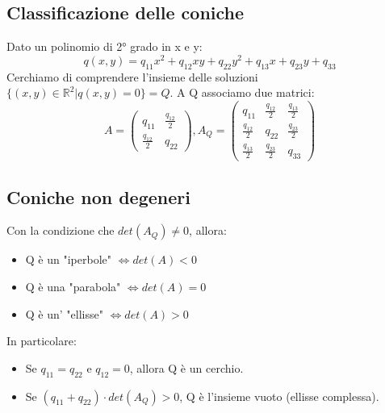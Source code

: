 \documentclass[12pt]{article}
\newenvironment{para}{\begin{adjustwidth}{13mm}{}}{\end{adjustwidth}}
\begin{document}
\begin{para}
\section{Classificazione delle coniche}
Dato un polinomio di 2° grado in x e y: $$q(x,y) = q_{11}x^2+q_{12}xy+q_{22}y^2+q_{13}x+q_{23}y+q_{33}$$
Cerchiamo di comprendere l'insieme delle soluzioni $\{(x,y) \in \mathbb{R}^2 | q(x,y)=0\} = Q$. A Q associamo due matrici: $$A = \begin{pmatrix}
    q_{11} & \frac{q_{12}}{2}\\
    \frac{q_{12}}{2} & q_{22}
\end{pmatrix}, A_Q=\begin{pmatrix}
    q_{11} & \frac{q_{12}}{2} & \frac{q_{13}}{2} \\
    \frac{q_{12}}{2} & q_{22} & \frac{q_{23}}{2} \\
    \frac{q_{13}}{2} & \frac{q_{23}}{2} & q_{33}
\end{pmatrix}$$
\subsection{Coniche non degeneri}
Con la condizione che $det(A_Q) \neq 0$, allora: 
\begin{itemize}
    \item Q è un "iperbole" $\Leftrightarrow det(A) < 0$
    \item Q è una "parabola" $\Leftrightarrow det(A) = 0$
    \item Q è un' "ellisse" $\Leftrightarrow det(A) > 0$
\end{itemize}
In particolare:
\begin{itemize}
    \item Se $q_{11} = q_{22}$ e $q_{12} = 0$, allora Q è un cerchio.
    \item Se $(q_{11}+q_{22}) \cdot det(A_Q) > 0$, Q è l'insieme vuoto (ellisse complessa).
\end{itemize}

\end{para}
\end{document}
